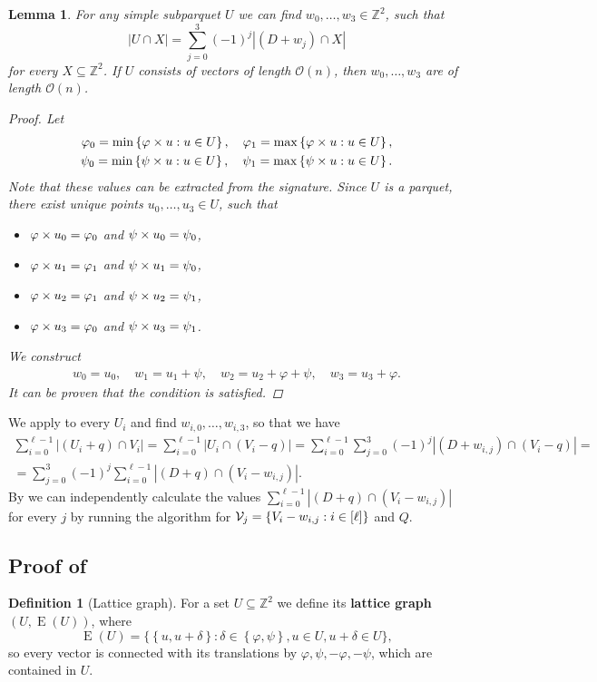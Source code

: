 \documentclass[11pt]{article}
\newcommand{\Z}{\mathbb{Z}}
\renewcommand{\O}{\mathcal{O}}
\renewcommand{\phi}{\varphi}
\newcommand{\set}[1]{\left\lbrace #1 \right\rbrace}
\newcommand{\bigset}[1]{\big \lbrace #1 \big \rbrace}
\newcommand{\eq}[1]{\begin{align*} #1 \end{align*}}
\theoremstyle{plain}
\newtheorem{lemma}{Lemma}
\theoremstyle{definition}
\newtheorem{definition}{Definition}
\theoremstyle{remark}
\DeclareMathOperator*{\Edges}{E}
\begin{document}
\begin{lemma}\label{primitive}
	For any simple subparquet $U$ we can find $w_0, \dots, w_3 \in \Z^2$, such that
	\[ |U \cap X| = \sum_{j = 0}^3 (-1)^j |(D + w_j) \cap X|\]
	for every $X \subseteq \Z^2$.
	If $U$ consists of vectors of length $\O(n)$, then $w_0, \dots, w_3$ are of length $\O(n)$.
	\begin{proof}
		Let \eq{
			\phi_0 = \min\set{{\h{u} : u \in U}}, \quad 
			\phi_1 = \max\set{{\h{u} : u \in U}},\\
			\psi_0 = \min\set{{\s{u} : u \in U}}, \quad
			\psi_1 = \max\set{{\s{u} : u \in U}}.
		}
		Note that these values can be extracted from the signature.
		Since $U$ is a parquet, there exist unique points $u_0, \dots, u_3 \in U$, such that
		\begin{itemize}
			\item $\h{u_0} = \phi_0$ and $\psi \times u_0 = \psi_0$,
			\item $\h{u_1} = \phi_1$ and $\psi \times u_1 = \psi_0$,
			\item $\h{u_2} = \phi_1$ and $\psi \times u_2 = \psi_1$,
			\item $\h{u_3} = \phi_0$ and $\psi \times u_3 = \psi_1$.
		\end{itemize}
		We construct \eq{
			w_0 = u_0, \quad 
			w_1 = u_1 + \psi, \quad
			w_2 = u_2 + \phi + \psi, \quad
			w_3 = u_3 + \phi.
		}
		It can be proven that the condition is satisfied.
	\end{proof}
\end{lemma}

We apply  to every $U_i$ and find $w_{i, 0}, \dots, w_{i, 3}$, so that we have
\eq{
	\sum_{i = 0}^{\ell - 1}|(U_i + q) \cap V_i| 
= \sum_{i = 0}^{\ell - 1}|U_i \cap (V_i - q)| 
= \sum_{i = 0}^{\ell - 1} \sum_{j = 0}^3 (-1)^j |(D + w_{i, j}) \cap (V_i - q)| = \\
= \sum_{j = 0}^3 (-1)^j \sum_{i = 0}^{\ell - 1} |(D + q) \cap (V_i - w_{i, j})|.
}
By  we can independently calculate the values $\sum_{i = 0}^{\ell - 1} |(D + q) \cap (V_i - w_{i, j})|$ for every $j$ by running the algorithm for $\V_j = \set{V_i - w_{i, j} : i \in [\ell]}$ and $Q$.


\subsection{Proof of } \label{parquet_decomposition_proof}


\begin{definition}[Lattice graph]
	For a set $U \subseteq \Z^2$ we define its \textbf{lattice graph} $(U, \Edges(U))$, where
	\[ \Edges(U) = \bigset{\set{u, u + \delta} : \delta \in \set{\phi, \psi}, u \in U, u + \delta \in U},\] 
	so every vector is connected with its translations by $\phi, \psi, -\phi, -\psi$, which are contained in $U$.
\end{definition}
\end{document}
